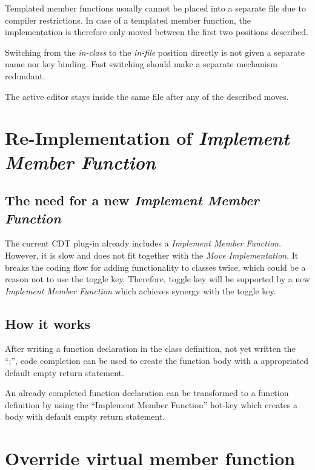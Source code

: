 Templated member functions  usually cannot be placed into
a separate file due to compiler restrictions. In case of a templated member
function, the implementation is therefore only moved between the first two
positions described.

Switching from the \textit{in-class} to the \textit{in-file} position directly
is not given a separate name nor key binding. Fast switching should make a
separate mechanism redundant. 

The active editor  stays inside the same file after any of
the described moves.

\section{Re-Implementation of \textit{Implement Member Function}}

\subsection[The need for a new \textit{Impl. Member Function}]{The need for a 
new \textit{Implement Member Function}}

The current CDT plug-in already includes a \textit{Implement Member Function}.
However, it is slow and does not fit together with the \textit{Move
Implementation}. It breaks the coding flow for adding functionality to classes
twice, which could be a reason not to use the toggle key. Therefore, toggle key
will be supported by a new \textit{Implement Member Function} which achieves
synergy with the toggle key.

\subsection{How it works}
After writing a function declaration in the class definition, not yet written
the ``;'', code completion can be used to create the function body with a
appropriated default empty return statement.\newline

An already completed function declaration can be transformed to a function
definition by using the ``Implement Member Function'' hot-key which creates a
body with default empty return statement.

\section{Override virtual member function}
